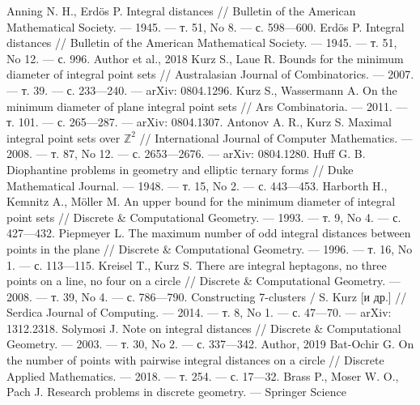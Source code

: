 \begin{thebibliography}{99}
Anning N. H., Erdös P. Integral distances // Bulletin of the American Mathematical
Society. — 1945. — т. 51, No 8. — с. 598—600.
Erdös P. Integral distances // Bulletin of the American Mathematical Society. — 1945. —
т. 51, No 12. — с. 996.
Author et al., 2018
Kurz S., Laue R. Bounds for the minimum diameter of integral point sets // Australasian
Journal of Combinatorics. — 2007. — т. 39. — с. 233—240. — arXiv: 0804.1296.
Kurz S., Wassermann A. On the minimum diameter of plane integral point sets // Ars
Combinatoria. — 2011. — т. 101. — с. 265—287. — arXiv: 0804.1307.
Antonov A. R., Kurz S. Maximal integral point sets over $\mathbb{Z}^2$ // International Journal of
Computer Mathematics. — 2008. — т. 87, No 12. — с. 2653—2676. — arXiv: 0804.1280.
Huff G. B. Diophantine problems in geometry and elliptic ternary forms // Duke
Mathematical Journal. — 1948. — т. 15, No 2. — с. 443—453.
Harborth H., Kemnitz A., Möller M. An upper bound for the minimum diameter of integral
point sets // Discrete \& Computational Geometry. — 1993. — т. 9, No 4. — с. 427—432.
Piepmeyer L. The maximum number of odd integral distances between points in the plane //
Discrete \& Computational Geometry. — 1996. — т. 16, No 1. — с. 113—115.
Kreisel T., Kurz S. There are integral heptagons, no three points on a line, no four on a
circle // Discrete \& Computational Geometry. — 2008. — т. 39, No 4. — с. 786—790.
Constructing 7-clusters / S. Kurz [и др.] // Serdica Journal of Computing. — 2014. — т. 8,
No 1. — с. 47—70. — arXiv: 1312.2318.
Solymosi J. Note on integral distances // Discrete \& Computational Geometry. — 2003. —
т. 30, No 2. — с. 337—342.
Author, 2019
Bat-Ochir G. On the number of points with pairwise integral distances on a circle // Discrete
Applied Mathematics. — 2018. — т. 254. — с. 17—32.
Brass P., Moser W. O., Pach J. Research problems in discrete geometry. — Springer Science

\end{thebibliography}

